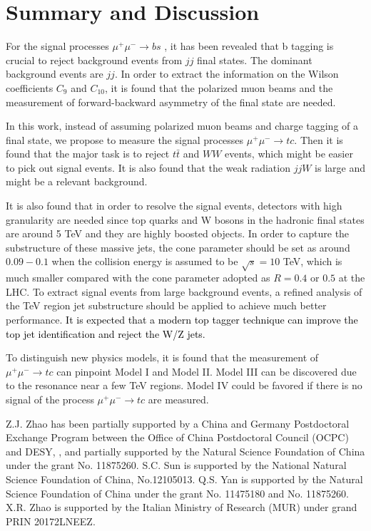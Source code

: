\documentclass[a4paper,11pt]{article}
\begin{document}
\section{Summary and Discussion}\label{Sec:conc}
For the signal processes $\mu^+ \mu^- \to b s$ \cite{Altmannshofer:2022xri}, it has been revealed that b tagging is crucial to reject background events from $jj$ final states. The dominant background events are $j j$. In order to extract the information on the Wilson coefficients $C_{9}$ and $C_{10}$, it is found that the polarized muon beams and the measurement of forward-backward asymmetry of the final state are needed. 

In this work, instead of assuming polarized muon beams and charge tagging of a final state, we propose to measure the signal processes $\mu^+ \mu^- \to t c$. Then it is found that the major task is to reject $t \bar{t}$ and $ W W$ events, which might be easier to pick out signal events. It is also found that the weak radiation $ j j W$ is large and might be a relevant background.

It is also found that in order to resolve the signal events, detectors with high granularity are needed since top quarks and W bosons in the hadronic final states are around 5 TeV and they are highly boosted objects. In order to capture the substructure of these massive jets, the cone parameter should be set as around  $0.09-0.1$ when the collision energy is assumed to be $\sqrt{s}=10$ TeV, which is much smaller compared with the cone parameter adopted as $R=0.4$ or $0.5$ at the LHC. To extract signal events from large background events, a refined analysis of the TeV region jet substructure should be applied to achieve much better performance. \textcolor{black}{It is expected that a modern top tagger technique can improve the top jet identification and reject the W/Z jets.}


To distinguish new physics models, it is found that the measurement of  $\mu^+ \mu^- \to tc$ can pinpoint Model I and Model II. Model III can be discovered due to the resonance near a few TeV regions. Model IV could be favored if there is no signal of the process $\mu^+ \mu^- \to t c$ are measured.

	\begin{acknowledgments}
                Z.J. Zhao has been partially supported by a 
                China and Germany Postdoctoral Exchange Program between the Office of China Postdoctoral Council (OCPC) and DESY,
		, and partially supported by the Natural Science
		Foundation of China under the grant No. 11875260. 
		S.C. Sun is supported by the National Natural Science Foundation of China, No.12105013.
		Q.S. Yan is supported by the Natural Science Foundation of China
		under the grant No.  11475180 and No. 11875260.
		X.R. Zhao is supported by the Italian Ministry of Research (MUR) under grand PRIN 20172LNEEZ.

	\end{acknowledgments}
\end{document}
